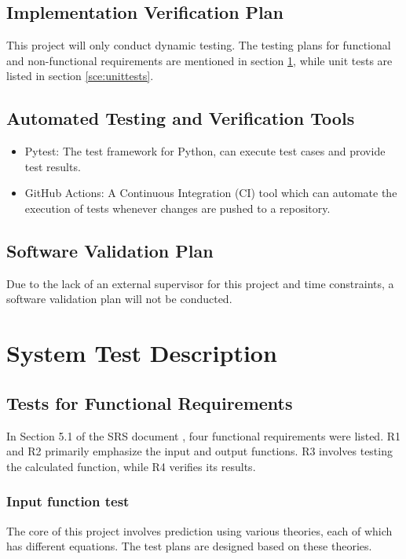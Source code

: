\documentclass[12pt, titlepage]{article}
\begin{document}
\subsection{Implementation Verification Plan}

This project will only conduct dynamic testing. The testing plans for functional and non-functional requirements are mentioned in section \ref{sec:systests}, while unit tests are listed in section \ref{sce:unittests}.

\subsection{Automated Testing and Verification Tools} \label{sec:autoTnV}

\begin{itemize}
    \item Pytest: The test framework for Python, can execute test cases and provide test results.
    \item GitHub Actions: A Continuous Integration (CI) tool which can automate the execution of tests whenever changes are pushed to a repository.
\end{itemize}

\subsection{Software Validation Plan} \label{sec:softwarevp}

Due to the lack of an external supervisor for this project and time constraints, a software validation plan will not be conducted.

\section{System Test Description} \label{sec:systests}
	
\subsection{Tests for Functional Requirements}
In Section 5.1 of the SRS document \cite{srs}, four functional requirements were listed. R1 and R2 primarily emphasize the input and output functions. R3 involves testing the calculated function, while R4 verifies its results.

\subsubsection{Input function test}
The core of this project involves prediction using various theories, each of which has different equations. The test plans are designed based on these theories.
\end{document}
